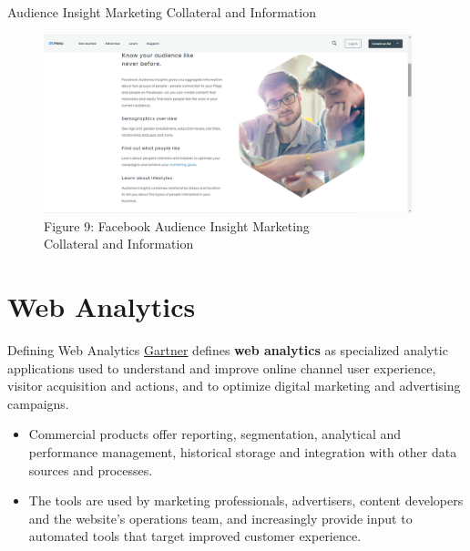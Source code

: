\documentclass[pdf]{beamer}
\newcommand{\empr}[1]{{\color{franklinblue}\textbf{#1}}}
\theoremstyle{remark}
\theoremstyle{definition}
\begin{document}
\begin{frame}[t]{Audience Insight Marketing Collateral and Information}
\begin{figure}[htbp]
  \captionsetup{justification=centering}
  \includegraphics[height=5.2cm, trim=0.0cm 0.0cm 0.0cm 0.0cm width=5.2cm]{Images/Facebook_Audience_Insights_120122.png}
  \caption{Figure {\color{franklinblue} 9}: Facebook Audience Insight Marketing \\ Collateral and Information}
\end{figure}
\end{frame}

\section{Web Analytics}

\begin{frame}[t]{Defining Web Analytics}
\href{https://www.gartner.com/en/information-technology/glossary/web-analytics}{Gartner} defines \empr{web analytics} as specialized analytic applications used to understand and improve online channel user experience, visitor acquisition and actions, and to optimize digital marketing and advertising campaigns. \\
\vspace{1.5ex}
\begin{itemize}
\item Commercial products offer reporting, segmentation, analytical and performance management, historical storage and integration with other data sources and processes. 
\item The tools are used by marketing professionals, advertisers, content developers and the website's operations team, and increasingly provide input to automated tools that target improved customer experience. 
\end{itemize}
\end{frame}
\end{document}
